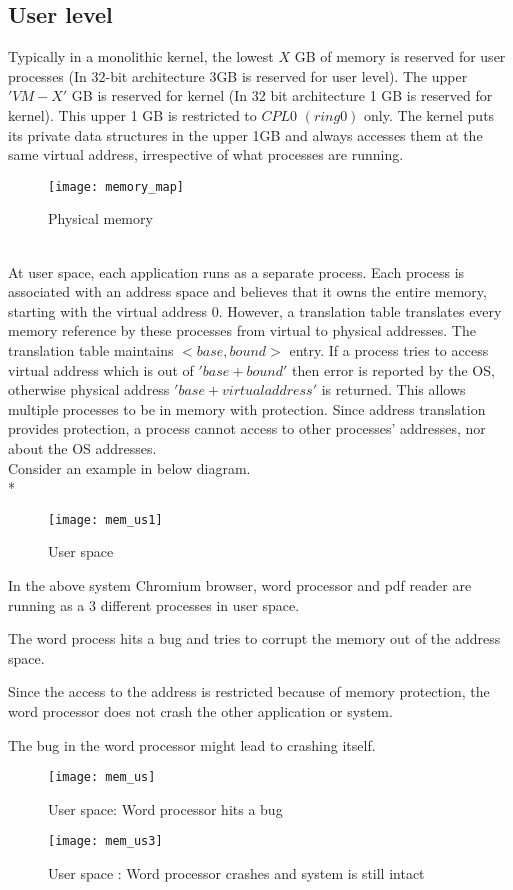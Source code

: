 \subsection{User level}

Typically in a monolithic kernel, the lowest $X$ GB of memory is reserved for user processes (In 32-bit architecture 3GB is reserved for user level). The upper $'VM - X'$ GB is reserved for kernel (In 32 bit architecture 1 GB is reserved for kernel). This upper 1 GB is restricted to $CPL 0$ $(ring 0)$ only. The kernel puts its private data structures in the upper 1GB and always accesses them at the same virtual address, irrespective of what processes are running. 
\\
\begin{figure}[!ht]
\centering
\texttt{[image: memory\_map]}
\caption{Physical memory}
\label{fig:memmap}
\end{figure}
\\
At user space, each application runs as a separate process. Each process is associated with an address space and believes that it owns the entire memory, starting with the virtual address 0.
However, a translation table translates every memory reference by these processes from virtual to physical addresses. The translation table maintains $<base, bound>$ entry. If a process tries to access virtual address which is out of $'base + bound'$ then error is reported by the OS, otherwise physical address $'base + virtual address'$ is returned. This allows multiple processes to be in memory with protection. Since address translation provides protection, a process cannot access to other processes’ addresses, nor about the OS addresses.
\\
Consider an example in below diagram.
\\*
\begin{figure}[!ht]
\centering
\texttt{[image: mem\_us1]}
\caption{User space}
\label{fig:User space}
\end{figure}
\begin{description}
\item In the above system Chromium browser, word processor and pdf reader are running as a 3 different processes in user space.
\item The word process hits a bug and tries to corrupt the memory out of the address space.
\item Since the access to the address is restricted because of memory protection, the word processor does not crash the other application or system.
\item The bug in the word processor might lead to crashing itself.
\end{description}
\begin{figure}[!ht]
\centering
\texttt{[image: mem\_us]}
\caption{User space: Word processor hits a bug}
\label{fig:User space}
\end{figure}
\begin{figure}[!ht]
\centering
\texttt{[image: mem\_us3]}
\caption{User space : Word processor crashes and system is still intact}
\label{fig:User space}
\end{figure}

